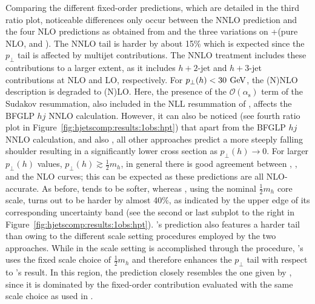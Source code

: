 Comparing the different fixed-order predictions, which are detailed in 
the third ratio plot, noticeable differences only
occur between the NNLO prediction and the four NLO predictions as
obtained from \hjetscompPowheg and the three variations on \hjetscompGoSam{}+\hjetscompSherpa (pure
NLO, \hjetscompMinlo and \hjetscompLoopsim). The NNLO tail is harder by about 15\% which
is expected since the $p_\perp$ tail is affected by multijet
contributions. The NNLO treatment includes these contributions to a
larger extent, as it includes $h+2$-jet and $h+3$-jet contributions at
 NLO and LO, respectively. For $p_\perp(h)<30\,\text{\:GeV}$, the (N)NLO
description is degraded to (N)LO. Here, the presence of the
$\mathcal{O}(\alpha_\mathrm{s})$ term of the Sudakov resummation, also
included in the NLL resummation of \hjetscompResbos, affects the BFGLP $hj$
NNLO calculation. However, it can also be noticed (see fourth ratio plot in
Figure~\ref{fig:hjetscomp:results:1obs:hpt}) that apart from the BFGLP
$hj$ NNLO calculation, \hjetscompResbos and also \hjetscompPowheg, all other approaches
predict a more steeply falling shoulder resulting in a significantly
lower cross section as $p_\perp(h)\to0$.
For larger $p_\perp(h)$ values, $p_\perp(h)\gtrsim\tfrac{1}{2}m_h$, in
general there is good agreement between \hjetscompPowheg, \hjetscompMGaMC, \hjetscompSherpa
\hjetscompMEPSatNLO and the NLO curves; this can be expected as these
predictions are all NLO-accurate. As before, \hjetscompHerwig tends to be
softer, whereas \hjetscompMGaMC, using the nominal $\tfrac{1}{2}m_h$ core scale,
turns out to be harder by almost 40\%, as indicated by the upper edge
of its corresponding uncertainty band (see the second or last subplot
to the right in Figure~\ref{fig:hjetscomp:results:1obs:hpt}). \hjetscompSherpa's
\hjetscompNNLOPS prediction also features a harder tail than \hjetscompPowheg owing to the
different scale setting procedures employed by the two approaches.
While in \hjetscompPowheg the scale setting is accomplished through the \hjetscompMinlo
procedure, \hjetscompSherpa's \hjetscompNNLOPS uses the fixed scale choice of $\tfrac{1}{2}m_h$
and therefore enhances the $p_\perp$ tail with respect to \hjetscompPowheg's
result. In this region, the \hjetscompResbos prediction closely resembles the
one given by \hjetscompSherpa \hjetscompNNLOPS, since it is dominated by the fixed-order
contribution evaluated with the same scale choice as used in \hjetscompSherpa.

